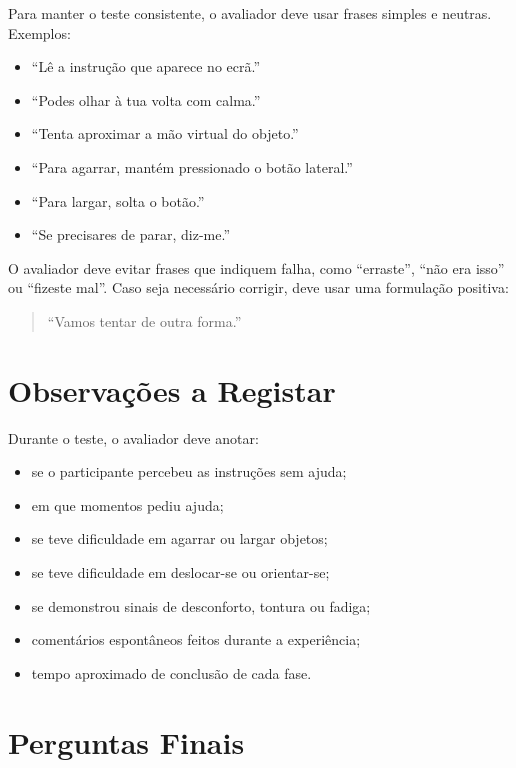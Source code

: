 \documentclass[12pt,a4paper,oneside]{report}
\begin{document}
Para manter o teste consistente, o avaliador deve usar frases simples e neutras. Exemplos:

\begin{itemize}
    \item ``Lê a instrução que aparece no ecrã.''
    \item ``Podes olhar à tua volta com calma.''
    \item ``Tenta aproximar a mão virtual do objeto.''
    \item ``Para agarrar, mantém pressionado o botão lateral.''
    \item ``Para largar, solta o botão.''
    \item ``Se precisares de parar, diz-me.''
\end{itemize}

O avaliador deve evitar frases que indiquem falha, como ``erraste'', ``não era isso'' ou ``fizeste mal''. Caso seja necessário corrigir, deve usar uma formulação positiva:

\begin{quote}
    ``Vamos tentar de outra forma.''
\end{quote}

\section{Observações a Registar}

Durante o teste, o avaliador deve anotar:

\begin{itemize}
    \item se o participante percebeu as instruções sem ajuda;
    \item em que momentos pediu ajuda;
    \item se teve dificuldade em agarrar ou largar objetos;
    \item se teve dificuldade em deslocar-se ou orientar-se;
    \item se demonstrou sinais de desconforto, tontura ou fadiga;
    \item comentários espontâneos feitos durante a experiência;
    \item tempo aproximado de conclusão de cada fase.
\end{itemize}

\section{Perguntas Finais}
\end{document}
